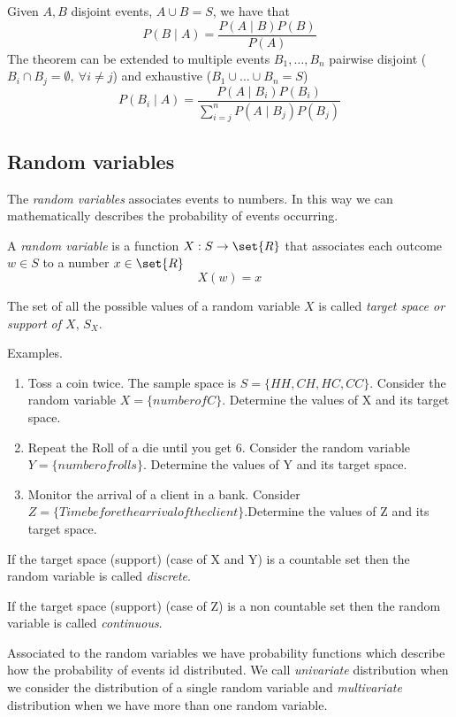 \begin{theorem}
    Given $A, B$ disjoint events, $A \cup B = S$, we have that
    $$ P(B \mid A) = \frac{P(A \mid B)P(B)}{P(A)} $$
    The theorem can be extended to multiple events $B_1, \hdots, B_n$ pairwise disjoint ($B_i \cap B_j = \emptyset,\ \forall i \neq j$) and exhaustive ($B_1 \cup \hdots \cup B_n = S$)
    $$ P(B_i \mid A) = \frac{P(A \mid B_i)P(B_i)}{\sum_{i=j}^{n}{P(A \mid B_j)P(B_j)}} $$
\end{theorem}

\subsection{Random variables}
The \textit{random variables} associates events to numbers. In this way we can mathematically describes the probability
of events occurring.
\begin{definition}
    A \textit{random variable} is a function $X: S \rightarrow \set{R}$ that associates each outcome $w \in S$ to a number $x \in \set{R}$
    $$ X(w) = x $$
\end{definition}

\begin{definition}
    The set of all the possible values of a random variable $X$ is called \textit{target space or support of $X$}, $S_X$.
\end{definition}

Examples. 
\begin{enumerate}
\item Toss a coin twice. The sample space is $S=\{HH, CH, HC, CC\}$. Consider the random variable $X=\{number of C\}$. Determine the values of X and its target space.
\item  Repeat the Roll of a die  until you get 6. Consider the random variable $Y=\{ number of rolls \}$.
Determine the values of Y and its target space.
\item Monitor the arrival of a client in a bank. Consider $Z=\{ Time before the arrival of the client \}$.Determine the values of Z and its target space.

\end{enumerate}

If the target space (support) (case of X and Y) is a countable set then the random variable is called \textit{discrete}.

If the target space (support) (case of Z) is a non countable set then the random variable is called \textit{continuous}.

Associated to the random variables we have  probability functions which describe how the probability of events id distributed. We call \textit{univariate} distribution when we consider the distribution of  a single random variable and \textit{multivariate} distribution when we have more than one random variable.

